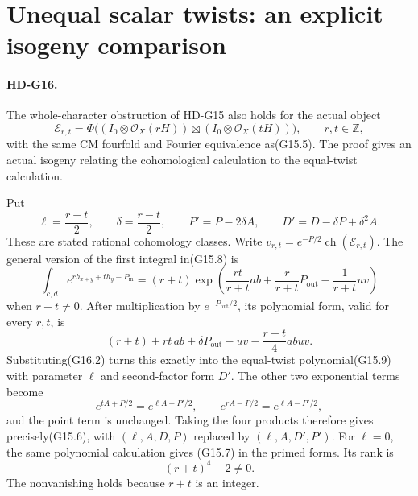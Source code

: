 \section{Unequal scalar twists: an explicit isogeny comparison}

\paragraph{HD-G16.}
The whole-character obstruction of HD-G15 also holds for
the actual object
\[
 \mathcal E_{r,t}
   =\Phi\bigl((I_0\otimes\mathcal O_X(rH))
                 \boxtimes(I_0\otimes\mathcal O_X(tH))\bigr),
 \qquad r,t\in\mathbb Z,
                                                               \tag{G16.1}
\]
with the same CM fourfold and Fourier equivalence as(G15.5).
The proof gives an actual isogeny relating the cohomological
calculation to the equal-twist calculation.

Put
\[
 \ell=\frac{r+t}{2},\qquad \delta=\frac{r-t}{2},\qquad
 P'=P-2\delta A,\qquad D'=D-\delta P+\delta^2A.
                                                               \tag{G16.2}
\]
These are stated rational cohomology classes. Write
$v_{r,t}=e^{-P/2}\operatorname{ch}(\mathcal E_{r,t})$.
The general version of the first integral in(G15.8) is
\[
 \int_{c,d}e^{r h_{x+y}+t h_y-P_{\mathrm{in}}}
  =(r+t)\exp\left(\frac{rt}{r+t}ab
                    +\frac{r}{r+t}P_{\mathrm{out}}
                    -\frac{1}{r+t}uv\right)
                                                               \tag{G16.3}
\]
when $r+t\ne0$. After multiplication by
$e^{-P_{\mathrm{out}}/2}$, its polynomial form, valid for
every $r,t$, is
\[
 (r+t)+rt\,ab+\delta P_{\mathrm{out}}-uv
                         -\frac{r+t}{4}abuv.               \tag{G16.4}
\]
Substituting(G16.2) turns this exactly into the equal-twist
polynomial(G15.9) with parameter $\ell$ and second-factor
form $D'$.
The other two exponential terms become
\[
        e^{tA+P/2}=e^{\ell A+P'/2},\qquad
        e^{rA-P/2}=e^{\ell A-P'/2},
\]
and the point term is unchanged. Taking the four products
therefore gives precisely(G15.6), with
$(\ell,A,D,P)$ replaced by $(\ell,A,D',P')$.
For $\ell=0$, the same polynomial calculation gives
(G15.7) in the primed forms.
Its rank is
\[
                         (r+t)^4-2\ne0.                  \tag{G16.5}
\]
The nonvanishing holds because $r+t$ is an integer.

